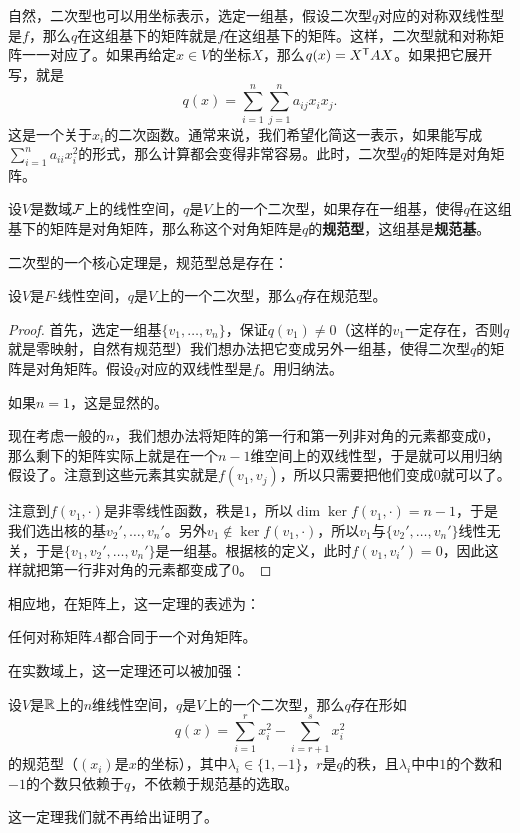 自然，二次型也可以用坐标表示，选定一组基，假设二次型$q$对应的对称双线性型是$f$，那么$q$在这组基下的矩阵就是$f$在这组基下的矩阵。这样，二次型就和对称矩阵一一对应了。如果再给定$x\in V$的坐标$X$，那么$q(x)=X^{\mathsf{T}} AX$。如果把它展开写，就是
\[
    q(x)=\sum_{i=1}^n\sum_{j=1}^n a_{ij}x_ix_j.
\]
这是一个关于$x_i$的二次函数。通常来说，我们希望化简这一表示，如果能写成$\sum_{i=1}^n a_{ii}x_i^2$的形式，那么计算都会变得非常容易。此时，二次型$q$的矩阵是对角矩阵。

\begin{definition}[规范型]\label{def:canonical-form}
    设$V$是数域$\mathcal{F}$上的线性空间，$q$是$V$上的一个二次型，如果存在一组基，使得$q$在这组基下的矩阵是对角矩阵，那么称这个对角矩阵是$q$的\textbf{规范型}，这组基是\textbf{规范基}。
\end{definition}

二次型的一个核心定理是，规范型总是存在：
\begin{theorem}\label{thm:quadratic-form-diagonalization}
    设$V$是$F$-线性空间，$q$是$V$上的一个二次型，那么$q$存在规范型。
\end{theorem}
\begin{proof}
首先，选定一组基$\{v_1,\dots,v_n\}$，保证$q(v_1)\neq 0$（这样的$v_1$一定存在，否则$q$就是零映射，自然有规范型）我们想办法把它变成另外一组基，使得二次型$q$的矩阵是对角矩阵。假设$q$对应的双线性型是$f$。用归纳法。

如果$n=1$，这是显然的。

现在考虑一般的$n$，我们想办法将矩阵的第一行和第一列非对角的元素都变成$0$，那么剩下的矩阵实际上就是在一个$n-1$维空间上的双线性型，于是就可以用归纳假设了。注意到这些元素其实就是$f(v_1,v_j)$，所以只需要把他们变成$0$就可以了。

注意到$f(v_1,\cdot)$是非零线性函数，秩是$1$，所以$\dim\ker f(v_1,\cdot)=n-1$，于是我们选出核的基$v_2',\dots,v_n'$。另外$v_1\notin\ker f(v_1,\cdot)$，所以$v_1$与$\{v_2',\dots,v_n'\}$线性无关，于是$\{v_1,v_2',\dots,v_n'\}$是一组基。根据核的定义，此时$f(v_1,v_i')=0$，因此这样就把第一行非对角的元素都变成了$0$。
\end{proof}

相应地，在矩阵上，这一定理的表述为：
\begin{corollary}\label{cor:quadratic-form-diagonalization}
任何对称矩阵$A$都合同于一个对角矩阵。
\end{corollary}


在实数域上，这一定理还可以被加强：

\begin{theorem}[惯性定理]\label{thm:inertia-theorem}
    设$V$是$\mathbb{R}$上的$n$维线性空间，$q$是$V$上的一个二次型，那么$q$存在形如
    \[
        q(x)=\sum_{i=1}^r x_i^2-\sum_{i=r+1}^s x_i^2
    \]
    的规范型（$(x_i)$是$x$的坐标），其中$\lambda_i\in\{1,-1\}$，$r$是$q$的秩，且$\lambda_i$中中$1$的个数和$-1$的个数只依赖于$q$，不依赖于规范基的选取。
\end{theorem}
这一定理我们就不再给出证明了。

